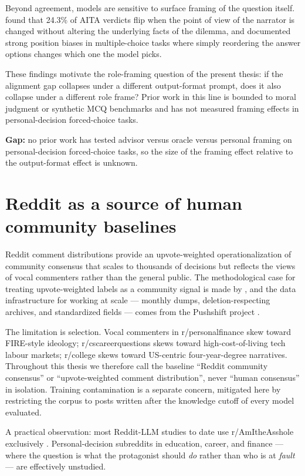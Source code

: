 Beyond agreement, models are sensitive to surface framing of the
question itself. \citet{vannuenen-2026-fragility} found that 24.3\%
of AITA verdicts flip when the point of view of the narrator is
changed without altering the underlying facts of the dilemma, and
\citet{pezeshkpour-2024-position-bias} documented strong position
biases in multiple-choice tasks where simply reordering the answer
options changes which one the model picks.

These findings motivate the role-framing question of the present
thesis: if the alignment gap collapses under a different
output-format prompt, does it also collapse under a different role
frame? Prior work in this line is bounded to moral judgment or
synthetic MCQ benchmarks and has not measured framing effects in
personal-decision forced-choice tasks.

\textbf{Gap:} no prior work has tested advisor versus oracle versus
personal framing on personal-decision forced-choice tasks, so the
size of the framing effect relative to the output-format effect is
unknown.

\section{Reddit as a source of human community baselines}
\label{sec:reddit-baseline}

Reddit comment distributions provide an upvote-weighted
operationalization of community consensus that scales to thousands
of decisions but reflects the views of vocal commenters rather than
the general public. The methodological case for treating
upvote-weighted labels as a community signal is made by
\citet{sachdeva-2025-aita}, and the data infrastructure for working
at scale --- monthly dumps, deletion-respecting archives, and
standardized fields --- comes from the Pushshift project
\citep{baumgartner-2020-pushshift}.

The limitation is selection. Vocal commenters in r/personalfinance
skew toward FIRE-style ideology; r/cscareerquestions skews toward
high-cost-of-living tech labour markets; r/college skews toward
US-centric four-year-degree narratives. Throughout this thesis we
therefore call the baseline ``Reddit community consensus'' or
``upvote-weighted comment distribution'', never ``human consensus''
in isolation. Training contamination is a separate concern,
mitigated here by restricting the corpus to posts written after the
knowledge cutoff of every model evaluated.

A practical observation: most Reddit-LLM studies to date use
r/AmItheAsshole exclusively
\citep{russo-2026-pluralistic, sachdeva-2025-aita,
vannuenen-2026-fragility}. Personal-decision subreddits in
education, career, and finance --- where the question is what the
protagonist should \emph{do} rather than who is at \emph{fault} ---
are effectively unstudied.

